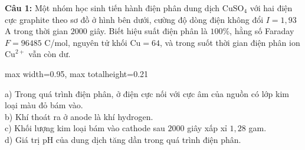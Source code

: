 \documentclass[12pt,a4paper]{article}
\begin{document}
\noindent \textbf{Câu 1:} Một nhóm học sinh tiến hành điện phân dung dịch $\text{CuSO}_4$ với hai điện cực graphite theo sơ đồ ở hình bên dưới, cường độ dòng điện không đổi $I = 1{,}93$ A trong thời gian $2000$ giây. Biết hiệu suất điện phân là $100\%$, hằng số Faraday $F = 96485$ C/mol, nguyên tử khối $\text{Cu} = 64$, và trong suốt thời gian điện phân ion $\text{Cu}^{2+}$ vẫn còn dư.\\
\begin{center}
\begin{adjustbox}{max width=0.95\linewidth, max totalheight=0.21\textheight}
\end{adjustbox}
\end{center}
\noindent a) Trong quá trình điện phân, ở điện cực nối với cực âm của nguồn có lớp kim loại màu đỏ bám vào.\\

\noindent b) Khí thoát ra ở anode là khí hydrogen.\\

\noindent c) Khối lượng kim loại bám vào cathode sau $2000$ giây xấp xỉ $1{,}28$ gam.\\

\noindent d) Giá trị pH của dung dịch tăng dần trong quá trình điện phân.\\
\end{document}
